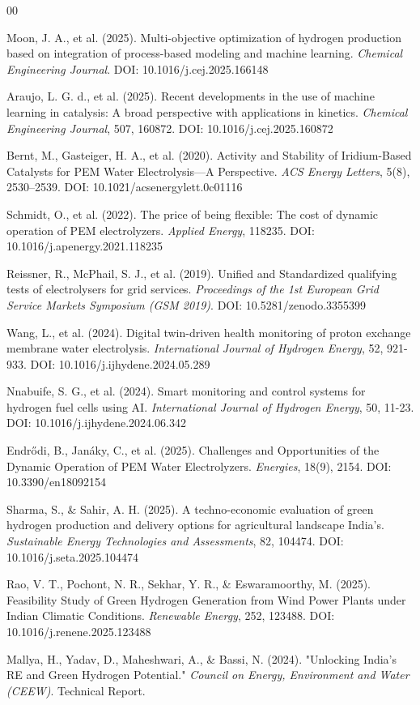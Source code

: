 \documentclass[preprint,12pt]{elsarticle}
\begin{document}
\begin{thebibliography}{00}

Moon, J. A., et al. (2025). Multi-objective optimization of hydrogen production based on integration of process-based modeling and machine learning. \textit{Chemical Engineering Journal}. DOI: 10.1016/j.cej.2025.166148

Araujo, L. G. d., et al. (2025). Recent developments in the use of machine learning in catalysis: A broad perspective with applications in kinetics. \textit{Chemical Engineering Journal}, 507, 160872. DOI: 10.1016/j.cej.2025.160872

Bernt, M., Gasteiger, H. A., et al. (2020). Activity and Stability of Iridium-Based Catalysts for PEM Water Electrolysis—A Perspective. \textit{ACS Energy Letters}, 5(8), 2530–2539. DOI: 10.1021/acsenergylett.0c01116

Schmidt, O., et al. (2022). The price of being flexible: The cost of dynamic operation of PEM electrolyzers. \textit{Applied Energy}, 118235. DOI: 10.1016/j.apenergy.2021.118235

Reissner, R., McPhail, S. J., et al. (2019). Unified and Standardized qualifying tests of electrolysers for grid services. \textit{Proceedings of the 1st European Grid Service Markets Symposium (GSM 2019)}. DOI: 10.5281/zenodo.3355399

Wang, L., et al. (2024). Digital twin-driven health monitoring of proton exchange membrane water electrolysis. \textit{International Journal of Hydrogen Energy}, 52, 921-933. DOI: 10.1016/j.ijhydene.2024.05.289

Nnabuife, S. G., et al. (2024). Smart monitoring and control systems for hydrogen fuel cells using AI. \textit{International Journal of Hydrogen Energy}, 50, 11-23. DOI: 10.1016/j.ijhydene.2024.06.342

Endrődi, B., Janáky, C., et al. (2025). Challenges and Opportunities of the Dynamic Operation of PEM Water Electrolyzers. \textit{Energies}, 18(9), 2154. DOI: 10.3390/en18092154

Sharma, S., \& Sahir, A. H. (2025). A techno-economic evaluation of green hydrogen production and delivery options for agricultural landscape India's. \textit{Sustainable Energy Technologies and Assessments}, 82, 104474. DOI: 10.1016/j.seta.2025.104474

Rao, V. T., Pochont, N. R., Sekhar, Y. R., \& Eswaramoorthy, M. (2025). Feasibility Study of Green Hydrogen Generation from Wind Power Plants under Indian Climatic Conditions. \textit{Renewable Energy}, 252, 123488. DOI: 10.1016/j.renene.2025.123488

Mallya, H., Yadav, D., Maheshwari, A., \& Bassi, N. (2024). "Unlocking India's RE and Green Hydrogen Potential." \textit{Council on Energy, Environment and Water (CEEW)}. Technical Report.

\end{thebibliography}
\end{document}
